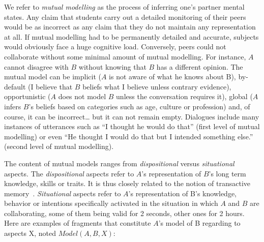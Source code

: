 \documentclass[twocolumn]{article}
\begin{document}
We refer to \emph{mutual modelling} as the process of inferring one's partner
mental states. Any claim that students carry out a detailed monitoring of their
peers would be as incorrect as any claim that they do not maintain any
representation at all. If mutual modelling had to be permanently detailed and
accurate, subjects would obviously face a huge cognitive load. Conversely, peers
could not collaborate without some minimal amount of mutual modelling. For
instance, $A$ cannot disagree with $B$ without knowing that $B$ has a different
opinion. The mutual model can be implicit ($A$ is not aware of what he knows about
B), by-default (I believe that $B$ beliefs what I believe unless contrary
evidence), opportunistic ($A$ does not model $B$ unless the conversation requires
it), global ($A$ infers $B$'s beliefs based on categories such as age, culture or
profession) and, of course, it can be incorrect… but it can not remain empty.
Dialogues include many instances of utterances such as ``I thought he would do
that'' (first level of mutual modelling) or even ``He thought I would do that
but I intended something else.'' (second level of mutual modelling).

The content of mutual models ranges from \emph{dispositional} versus
\emph{situational} aspects. The \emph{dispositional} aspects refer to $A$'s
representation of $B$'s long term knowledge, skills or traits. It is thus closely
related to the notion of transactive memory~\citep{wegner1987transactive,
moreland1999transactive}.  \emph{Situational} aspects refer to $A$'s representation of
B's knowledge, behavior or intentions specifically activated in the situation in
which $A$ and $B$ are collaborating, some of them being valid for 2 seconds, other
ones for 2 hours.  Here are examples of fragments that constitute $A$'s model of B
regarding to aspects X, noted $Model(A,B,X)$:
\end{document}
